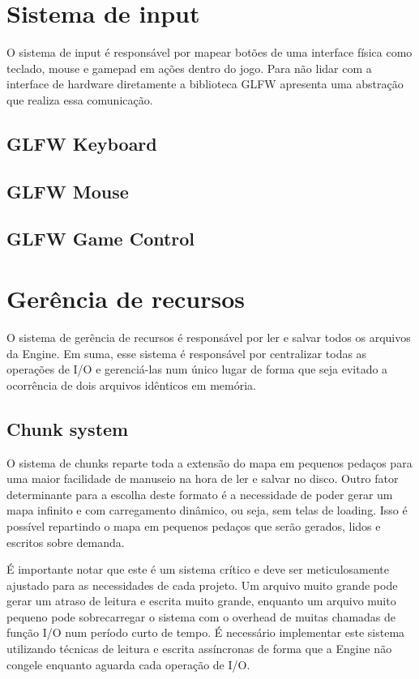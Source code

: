 \documentclass[12pt, 
openright, 
oneside, 
a4paper,    
brazil]{facom-ufu-abntex2}
\begin{document}
\section{Sistema de input}
O sistema de input é responsável por mapear botões de uma interface física como teclado, mouse e gamepad em ações dentro do jogo. Para não lidar com a interface de hardware diretamente a biblioteca GLFW apresenta uma abstração que realiza essa comunicação.

\subsection{GLFW Keyboard}
\subsection{GLFW Mouse}
\subsection{GLFW Game Control}

\section{Gerência de recursos}
O sistema de gerência de recursos é responsável por ler e salvar todos os arquivos da Engine. Em suma, esse sistema é responsável por centralizar todas as operações de I/O e gerenciá-las num único lugar de forma que seja evitado a ocorrência de dois arquivos idênticos em memória.

\subsection{Chunk system}
O sistema de chunks reparte toda a extensão do mapa em pequenos pedaços para uma maior facilidade de manuseio na hora de ler e salvar no disco. Outro fator determinante para a escolha deste formato é a necessidade de poder gerar um mapa infinito e com carregamento dinâmico, ou seja, sem telas de loading. Isso é possível repartindo o mapa em pequenos pedaços que serão gerados, lidos e escritos sobre demanda.

É importante notar que este é um sistema crítico e deve ser meticulosamente ajustado para as necessidades de cada projeto. Um arquivo muito grande pode gerar um atraso de leitura e escrita muito grande, enquanto um arquivo muito pequeno pode sobrecarregar o sistema com o overhead de muitas chamadas de função I/O num período curto de tempo. É necessário implementar este sistema utilizando técnicas de leitura e escrita assíncronas de forma que a Engine não congele enquanto aguarda cada operação de I/O.
\end{document}
